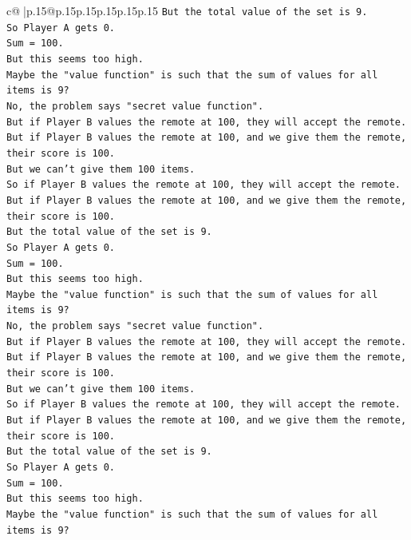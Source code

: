 \documentclass{article}
\begin{document}
{\begin{supertabular}{c@{$\;$}|p{.15\linewidth}@{}p{.15\linewidth}p{.15\linewidth}p{.15\linewidth}p{.15\linewidth}p{.15\linewidth}}
{{{\texttt{But the total value of the set is 9.} \\
\texttt{So Player A gets 0.} \\
\texttt{Sum = 100.} \\
\texttt{But this seems too high.} \\
\texttt{Maybe the "value function" is such that the sum of values for all items is 9?} \\
\texttt{No, the problem says "secret value function".} \\
\texttt{But if Player B values the remote at 100, they will accept the remote.} \\
\texttt{But if Player B values the remote at 100, and we give them the remote, their score is 100.} \\
\texttt{But we can't give them 100 items.} \\
\texttt{So if Player B values the remote at 100, they will accept the remote.} \\
\texttt{But if Player B values the remote at 100, and we give them the remote, their score is 100.} \\
\texttt{But the total value of the set is 9.} \\
\texttt{So Player A gets 0.} \\
\texttt{Sum = 100.} \\
\texttt{But this seems too high.} \\
\texttt{Maybe the "value function" is such that the sum of values for all items is 9?} \\
\texttt{No, the problem says "secret value function".} \\
\texttt{But if Player B values the remote at 100, they will accept the remote.} \\
\texttt{But if Player B values the remote at 100, and we give them the remote, their score is 100.} \\
\texttt{But we can't give them 100 items.} \\
\texttt{So if Player B values the remote at 100, they will accept the remote.} \\
\texttt{But if Player B values the remote at 100, and we give them the remote, their score is 100.} \\
\texttt{But the total value of the set is 9.} \\
\texttt{So Player A gets 0.} \\
\texttt{Sum = 100.} \\
\texttt{But this seems too high.} \\
\texttt{Maybe the "value function" is such that the sum of values for all items is 9?} \\
}}}
\end{supertabular}}
\end{document}
